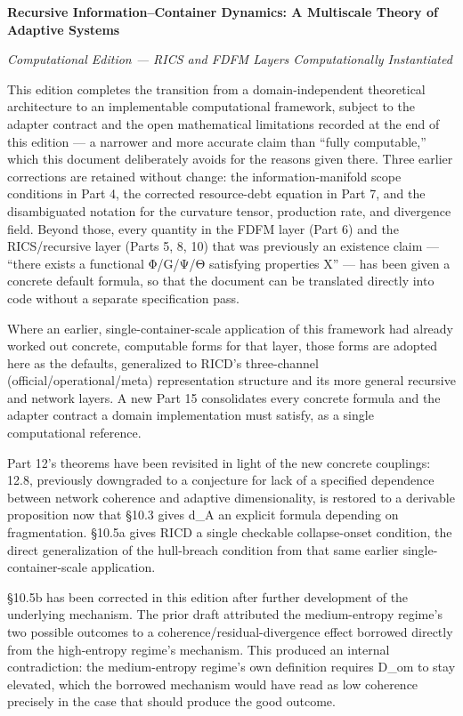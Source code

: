 \documentclass[
]{article}
\author{}
\date{}
\begin{document}
\textbf{Recursive Information--Container Dynamics: A Multiscale Theory
of Adaptive Systems}

\emph{Computational Edition --- RICS and FDFM Layers Computationally
Instantiated}

This edition completes the transition from a domain-independent
theoretical architecture to an implementable computational framework,
subject to the adapter contract and the open mathematical limitations
recorded at the end of this edition --- a narrower and more accurate
claim than ``fully computable,'' which this document deliberately avoids
for the reasons given there. Three earlier corrections are retained
without change: the information-manifold scope conditions in Part 4, the
corrected resource-debt equation in Part 7, and the disambiguated
notation for the curvature tensor, production rate, and divergence
field. Beyond those, every quantity in the FDFM layer (Part 6) and the
RICS/recursive layer (Parts 5, 8, 10) that was previously an existence
claim --- ``there exists a functional Φ/G/Ψ/Θ satisfying properties X''
--- has been given a concrete default formula, so that the document can
be translated directly into code without a separate specification pass.

Where an earlier, single-container-scale application of this framework
had already worked out concrete, computable forms for that layer, those
forms are adopted here as the defaults, generalized to RICD's
three-channel (official/operational/meta) representation structure and
its more general recursive and network layers. A new Part 15
consolidates every concrete formula and the adapter contract a domain
implementation must satisfy, as a single computational reference.

Part 12's theorems have been revisited in light of the new concrete
couplings: 12.8, previously downgraded to a conjecture for lack of a
specified dependence between network coherence and adaptive
dimensionality, is restored to a derivable proposition now that §10.3
gives d\_A an explicit formula depending on fragmentation. §10.5a gives
RICD a single checkable collapse-onset condition, the direct
generalization of the hull-breach condition from that same earlier
single-container-scale application.

§10.5b has been corrected in this edition after further development of
the underlying mechanism. The prior draft attributed the medium-entropy
regime's two possible outcomes to a coherence/residual-divergence effect
borrowed directly from the high-entropy regime's mechanism. This
produced an internal contradiction: the medium-entropy regime's own
definition requires D\_om to stay elevated, which the borrowed mechanism
would have read as low coherence precisely in the case that should
produce the good outcome.
\end{document}
